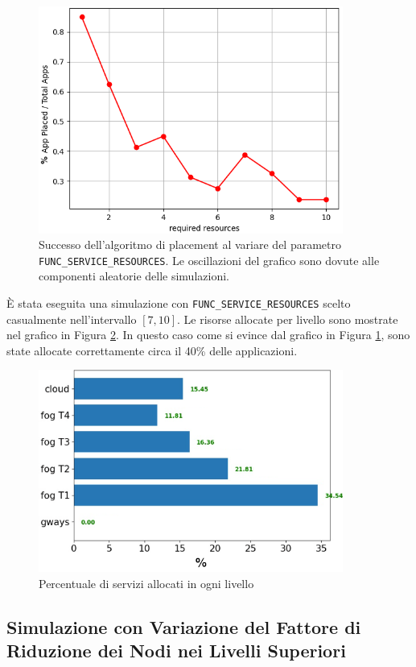 \begin{figure}[!ht]
  \includegraphics[width=10cm]{images/resources_placement_success}
  \centering
  \caption{Successo dell'algoritmo di placement al variare del parametro \texttt{FUNC\_SERVICE\_RESOURCES}. Le oscillazioni del grafico sono dovute alle componenti aleatorie delle simulazioni.}
  \label{fig:resources_placement_success}
\end{figure}

È stata eseguita una simulazione con \texttt{FUNC\_SERVICE\_RESOURCES} scelto casualmente nell'intervallo $[7, 10]$. Le risorse allocate per livello sono mostrate nel grafico in Figura \ref{fig:resources_placement_per_level}. In questo caso come si evince dal grafico in Figura \ref{fig:resources_placement_success}, sono state allocate correttamente circa il 40\% delle applicazioni.

\begin{figure}[!ht]
  \includegraphics[width=10cm]{images/resources_placement_per_level}
  \centering
  \caption{Percentuale di servizi allocati in ogni livello}
  \label{fig:resources_placement_per_level}
\end{figure}

\subsection{Simulazione con Variazione del Fattore di Riduzione dei Nodi nei Livelli Superiori}

